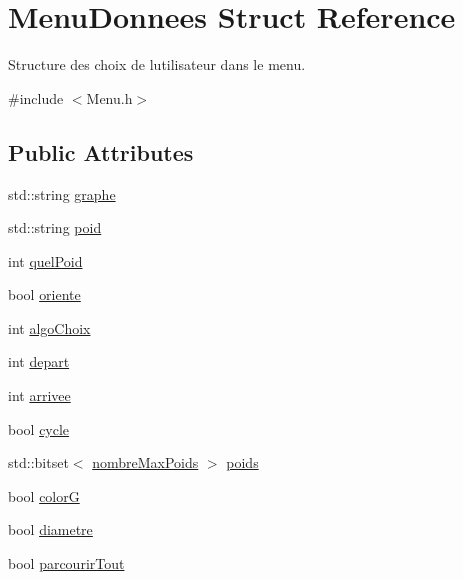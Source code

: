 \hypertarget{struct_menu_donnees}{}\section{Menu\+Donnees Struct Reference}
\label{struct_menu_donnees}


Structure des choix de l\textquotesingle{}utilisateur dans le menu.  




{\ttfamily \#include $<$Menu.\+h$>$}

\subsection*{Public Attributes}
\begin{DoxyCompactItemize}
\item 
std\+::string \mbox{\hyperlink{struct_menu_donnees_a50b1617a3d1d4acbe0e0943ed0bd8c85}{graphe}}
\item 
std\+::string \mbox{\hyperlink{struct_menu_donnees_ab6965a46bb5eb45820cb6148cfe1fc59}{poid}}
\item 
int \mbox{\hyperlink{struct_menu_donnees_aa2561120ada24f21a281f888005f086e}{quel\+Poid}}
\item 
bool \mbox{\hyperlink{struct_menu_donnees_a8772d877ced4cc5062de283fcb142740}{oriente}}
\item 
int \mbox{\hyperlink{struct_menu_donnees_ac26874f97726bdbd3b5572ac53b80b5f}{algo\+Choix}}
\item 
int \mbox{\hyperlink{struct_menu_donnees_ae3034ab7b7de61baae4a307a1bf6a72a}{depart}}
\item 
int \mbox{\hyperlink{struct_menu_donnees_a34e6e9f08547c4293bd988c2c8caaa5e}{arrivee}}
\item 
bool \mbox{\hyperlink{struct_menu_donnees_a61e5018cd2ea1778a413e9d5ec073b56}{cycle}}
\item 
std\+::bitset$<$ \mbox{\hyperlink{libraries_8h_ad73c201205ac3bfe4a118d327a7255ce}{nombre\+Max\+Poids}} $>$ \mbox{\hyperlink{struct_menu_donnees_a4ed6d7392ed72cfdcf8efb68018b5873}{poids}}
\item 
bool \mbox{\hyperlink{struct_menu_donnees_a1142c175e133959b15a3e04ea78f727b}{colorG}}
\item 
bool \mbox{\hyperlink{struct_menu_donnees_ae3e64467c62fbc8e7eb97ce87aee0924}{diametre}}
\item 
bool \mbox{\hyperlink{struct_menu_donnees_a32a58b38d2cbfe35df1f4b6386ba04b3}{parcourir\+Tout}}
\end{DoxyCompactItemize}


